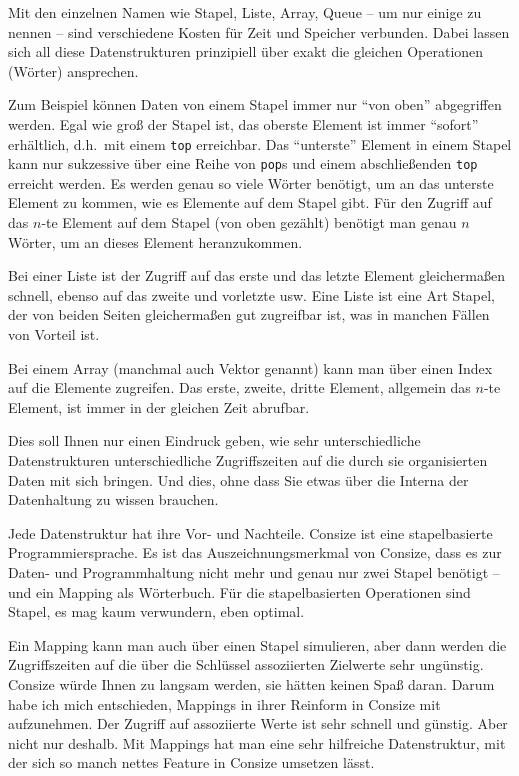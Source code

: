 Mit den einzelnen Namen wie Stapel, Liste, Array, Queue -- um nur einige zu nennen -- sind verschiedene Kosten für Zeit und Speicher verbunden. Dabei lassen sich all diese Datenstrukturen prinzipiell über exakt die gleichen Operationen (Wörter) ansprechen.

Zum Beispiel können Daten von einem Stapel immer nur "`von oben"' abgegriffen werden. Egal wie groß der Stapel ist, das oberste Element ist immer "`sofort"' erhältlich, d.h.\ mit einem \verb|top| erreichbar. Das "`unterste"' Element in einem Stapel kann nur sukzessive über eine Reihe von \verb|pop|s und einem abschließenden \verb|top| erreicht werden. Es werden genau so viele Wörter benötigt, um an das unterste Element zu kommen, wie es Elemente auf dem Stapel gibt. Für den Zugriff auf das $n$-te Element auf dem Stapel (von oben gezählt) benötigt man genau $n$ Wörter, um an dieses Element heranzukommen.

Bei einer Liste ist der Zugriff auf das erste und das letzte Element gleichermaßen schnell, ebenso auf das zweite und vorletzte usw. Eine Liste ist eine Art Stapel, der von beiden Seiten gleichermaßen gut zugreifbar ist, was in manchen Fällen von Vorteil ist.

Bei einem Array (manchmal auch Vektor genannt) kann man über einen Index auf die Elemente zugreifen. Das erste, zweite, dritte Element, allgemein das $n$-te Element, ist immer in der gleichen Zeit abrufbar.

Dies soll Ihnen nur einen Eindruck geben, wie sehr unterschiedliche Datenstrukturen unterschiedliche Zugriffszeiten auf die durch sie organisierten Daten mit sich bringen. Und dies, ohne dass Sie etwas über die Interna der Datenhaltung zu wissen brauchen.

Jede Datenstruktur hat ihre Vor- und Nachteile. Consize ist eine stapelbasierte Programmiersprache. Es ist das Auszeichnungsmerkmal von Consize, dass es zur Daten- und Programmhaltung nicht mehr und genau nur zwei Stapel benötigt -- und ein Mapping als Wörterbuch. Für die stapelbasierten Operationen sind Stapel, es mag kaum verwundern, eben optimal.

Ein Mapping kann man auch über einen Stapel simulieren, aber dann werden die Zugriffszeiten auf die über die Schlüssel assoziierten Zielwerte sehr ungünstig. Consize würde Ihnen zu langsam werden, sie hätten keinen Spaß daran. Darum habe ich mich entschieden, Mappings in ihrer Reinform in Consize mit aufzunehmen. Der Zugriff auf assoziierte Werte ist sehr schnell und günstig. Aber nicht nur deshalb. Mit Mappings hat man eine sehr hilfreiche Datenstruktur, mit der sich so manch nettes Feature in Consize umsetzen lässt.

